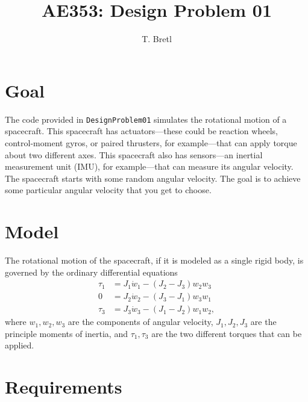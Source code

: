 \documentclass[12pt]{article}
\title{AE353: Design Problem 01}
\author{T. Bretl}
\begin{document}
\maketitle


\section{Goal}

The code provided in \lstinline!DesignProblem01! simulates the rotational motion of a spacecraft. This spacecraft has actuators---these could be reaction wheels, control-moment gyros, or paired thrusters, for example---that can apply torque about two different axes. This spacecraft also has sensors---an inertial measurement unit (IMU), for example---that can measure its angular velocity. The spacecraft starts with some random angular velocity. The goal is to achieve some particular angular velocity that you get to choose.

\section{Model}

The rotational motion of the spacecraft, if it is modeled as a single rigid body, is governed by the ordinary differential equations
\begin{align*}
\tau_{1} &= J_{1}\dot{w}_{1}-(J_{2}-J_{3})w_{2}w_{3} \\
0 &= J_{2}\dot{w}_{2}-(J_{3}-J_{1})w_{3}w_{1} \\
\tau_{3} &= J_{3}\dot{w}_{3}-(J_{1}-J_{2})w_{1}w_{2},
\end{align*}
where $w_{1},w_{2},w_{3}$ are the components of angular velocity, $J_{1},J_{2},J_{3}$ are the principle moments of inertia, and $\tau_{1},\tau_{3}$ are the two different torques that can be applied.

\section{Requirements}
\end{document}
